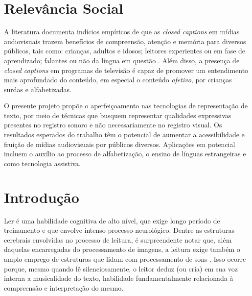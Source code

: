 \documentclass[a4paper,11pt,titlepage,singlespacing]{article}
\begin{document}
\newpage


\thispagestyle{empty}
\newpage


\newpage

\section*{Relevância Social}

\noindent A literatura documenta indícios empíricos de que as \emph{closed captions} em mídias audiovisuais trazem benefícios de compreensão, atenção e memória para diversos públicos, tais como: crianças, adultos e idosos; leitores experientes ou em fase de aprendizado; falantes ou não da língua em questão \cite{fiske_video_2015}. Além disso, a presença de \emph{closed captions} em programas de televisão é capaz de promover um entendimento mais aprofundado do conteúdo, em especial o conteúdo \emph{afetivo}, por crianças surdas e alfabetizadas\cite{murphy-berman_impact_1983}.

O presente projeto propõe o aperfeiçoamento nas tecnologias de representação de texto, por meio de técnicas que busquem representar qualidades expressivas presentes no registro sonoro e não necessariamente no registro visual. Os resultados esperados do trabalho têm o potencial de aumentar a acessibilidade e fruição de mídias audiovisuais por públicos diversos. Aplicações em potencial incluem o auxílio ao processo de alfabetização, o ensino de línguas estrangeiras e como tecnologia assistiva.

\newpage


\thispagestyle{empty}
\newpage


\renewcommand{\contentsname}{Sumário}
\tableofcontents

\newpage


\section{Introdução}

\noindent Ler é uma habilidade cognitiva de alto nível, que exige longo período de treinamento e que envolve intenso processo neurológico. Dentre as estruturas cerebrais envolvidas no processo de leitura, é surpreendente notar que, além daquelas encarregadas do processamento de imagens, a leitura exige também o amplo emprego de estruturas que lidam com processamento de sons \cite[cap.7]{seidenberg2017}. Isso ocorre porque, mesmo quando lê silenciosamente, o leitor deduz (ou cria) em sua voz interna a musicalidade do texto, habilidade fundamentalmente relacionada à compreensão e interpretação do mesmo.
\end{document}

